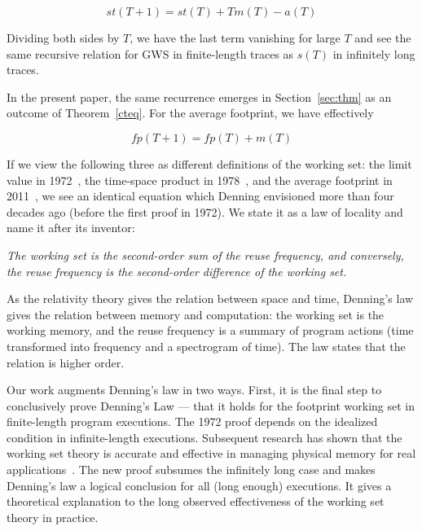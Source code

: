 $$st(T+1) = st(T) + Tm(T) - a(T)$$

\noindent Dividing both sides by $T$, we have the last term vanishing for large
$T$ and see the same recursive relation for GWS in finite-length traces as $s(T)$ in infinitely long
traces.

In the present paper, the same recurrence emerges in Section~\ref{sec:thm} as an
outcome of Theorem~\ref{cteq}.  For the average footprint, we have
effectively

$$fp(T+1) = fp(T) + m(T) $$

If we view the following three as different definitions of the working set: the
limit value in 1972~\cite{DenningS:CACM72}, the time-space product in
1978~\cite{DenningS:CACM78}, and the average footprint in
2011~\cite{Xiang+:PACT11}, we see an identical equation which Denning
envisioned more than four decades ago (before the first proof in 1972).  We
state it as a law of locality and name it after its inventor:

\newenvironment{dlaw}[1][\sc \bf Denning's Law of
Locality]{\begin{trivlist} \item[\hskip \labelsep {\bfseries #1}]}{\end{trivlist}}


\begin{dlaw} \emph{The working set is the second-order sum of the reuse
  frequency, and conversely, the reuse frequency is the second-order
  difference of the working set.}
\end{dlaw}

As the relativity theory gives the relation between space and time,
Denning's law gives the relation between memory and computation: the
working set is the working memory, and the reuse frequency is a
summary of program actions (time transformed into frequency and a
spectrogram of time).  The law states that the relation is higher
order.

Our work augments Denning's law in two ways.  First, it is the final
step to conclusively prove Denning's Law --- that it holds for the
footprint working set in finite-length program executions.  The 1972
proof depends on the idealized condition in infinite-length
executions.  Subsequent research has shown that the working set theory
is accurate and effective in managing physical memory for real
applications~\cite{Denning:TSE80}. The new proof subsumes the
infinitely long case and makes Denning's law a logical conclusion for
all (long enough) executions.  It gives a theoretical explanation to
the long observed effectiveness of the working set theory in practice.

